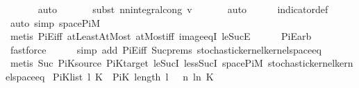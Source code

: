 \begin{isabellebody}
\ \ \ \ \ \isamarkupfalse%
\ auto\isanewline
\ \ \ \ \ \isamarkupfalse%
\ {\isacharparenleft}{\kern0pt}subst\ nn{\isacharunderscore}{\kern0pt}integral{\isacharunderscore}{\kern0pt}cong{\isacharbrackleft}{\kern0pt}\ v{\isacharequal}{\kern0pt}{\isachardoublequoteopen}{\isacharparenleft}{\kern0pt}{\isasymlambda}{\isacharunderscore}{\kern0pt}{\isachardot}{\kern0pt}{}{\isacharparenright}{\kern0pt}{\isachardoublequoteclose}{\isacharbrackright}{\kern0pt}{\isacharparenright}{\kern0pt}\isanewline
\ \ \ \ \ \isamarkupfalse%
\ auto\isanewline
\ \ \ \ \isamarkupfalse%
\ indicator{\isacharunderscore}{\kern0pt}def\ \isamarkupfalse%
\ {\isacharparenleft}{\kern0pt}auto\ simp{\isacharcolon}{\kern0pt}\ space{\isacharunderscore}{\kern0pt}PiM{\isacharparenright}{\kern0pt}\isanewline
\ \ \ \ \isamarkupfalse%
\ {\isacharparenleft}{\kern0pt}metis\ PiE{\isacharunderscore}{\kern0pt}iff\ atLeast{}AtMost\ atMost{\isacharunderscore}{\kern0pt}iff\ image{\isacharunderscore}{\kern0pt}eqI\ le{\isacharunderscore}{\kern0pt}SucE{\isacharparenright}{\kern0pt}\isanewline
\ \ \ \ \isamarkupfalse%
\ PiE{\isacharunderscore}{\kern0pt}arb\ \isamarkupfalse%
\ fastforce\isanewline
\ \ \ \ \isamarkupfalse%
\ {\isacharparenleft}{\kern0pt}simp\ add{\isacharcolon}{\kern0pt}\ PiE{\isacharunderscore}{\kern0pt}iff\ Suc{\isachardot}{\kern0pt}prems\ stochastic{\isacharunderscore}{\kern0pt}kernel{\isachardot}{\kern0pt}kernel{\isacharunderscore}{\kern0pt}space{\isacharunderscore}{\kern0pt}eq{\isacharunderscore}{\kern0pt}{}{\isacharparenright}{\kern0pt}\isanewline
\ \ \ \ \isamarkupfalse%
\ {\isacharparenleft}{\kern0pt}metis\ Suc\ PiK{\isacharunderscore}{\kern0pt}source\ PiK{\isacharunderscore}{\kern0pt}target\ le{\isacharunderscore}{\kern0pt}SucI\ less{\isacharunderscore}{\kern0pt}SucI\ space{\isacharunderscore}{\kern0pt}PiM\ stochastic{\isacharunderscore}{\kern0pt}kernel{\isachardot}{\kern0pt}kernel{\isacharunderscore}{\kern0pt}space{\isacharunderscore}{\kern0pt}eq{\isacharunderscore}{\kern0pt}{}{\isacharparenright}{\kern0pt}\isanewline
{}\isamarkupfalse%
%
\endisatagproof
{\isafoldproof}%
%
\isadelimproof
\isanewline
%
\endisadelimproof
\isanewline
{}\isamarkupfalse%
\ {\isachardoublequoteopen}PiK{\isacharunderscore}{\kern0pt}list\ l\ K\ {\isasymequiv}\ PiK\ {\isacharparenleft}{\kern0pt}length\ l\ {\isacharminus}{\kern0pt}\ {}{\isacharparenright}{\kern0pt}\ {\isacharparenleft}{\kern0pt}{\isasymlambda}n{\isachardot}{\kern0pt}\ l{\isacharbang}{\kern0pt}n{\isacharparenright}{\kern0pt}\ K{\isachardoublequoteclose}%

\end{isabellebody}
